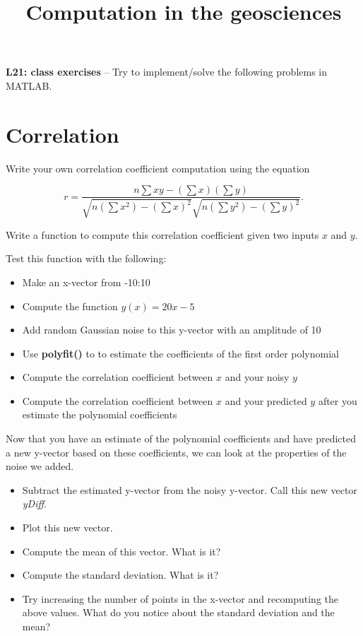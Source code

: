 \documentclass[10pt,fleqn]{article}
\title{Computation in the geosciences}
\date{\empty}
\begin{document}
\textbf{L21: class exercises} -- Try to implement/solve the following problems in MATLAB.

\section*{Correlation}

Write your own correlation coefficient computation using the equation

$$r = \frac{n \sum xy - (\sum x)(\sum y)}{\sqrt{n(\sum x^2)-(\sum x)^2}\sqrt{n(\sum y^2)-(\sum y)^2}}.$$

Write a function to compute this correlation coefficient given two inputs $x$ and $y$.

Test this function with the following:

\begin{itemize}
	\item Make an x-vector from -10:10
	\item Compute the function $y(x) = 20x - 5$
	\item Add random Gaussian noise to this y-vector with an amplitude of 10
	\item Use \textbf{polyfit()} to to estimate the coefficients of the first order polynomial 
	\item Compute the correlation coefficient between $x$ and your noisy $y$
	\item Compute the correlation coefficient between $x$ and your predicted $y$ after you estimate the polynomial coefficients
\end{itemize}

Now that you have an estimate of the polynomial coefficients and have predicted a new y-vector based on these coefficients, we can look at the properties of the noise we added.

\begin{itemize}
	\item Subtract the estimated y-vector from the noisy y-vector. Call this new vector \textit{yDiff}.
	\item Plot this new vector.
	\item Compute the mean of this vector. What is it?
	\item Compute the standard deviation. What is it?
	\item Try increasing the number of points in the x-vector and recomputing the above values. What do you notice about the standard deviation and the mean?
\end{itemize}
\end{document}
